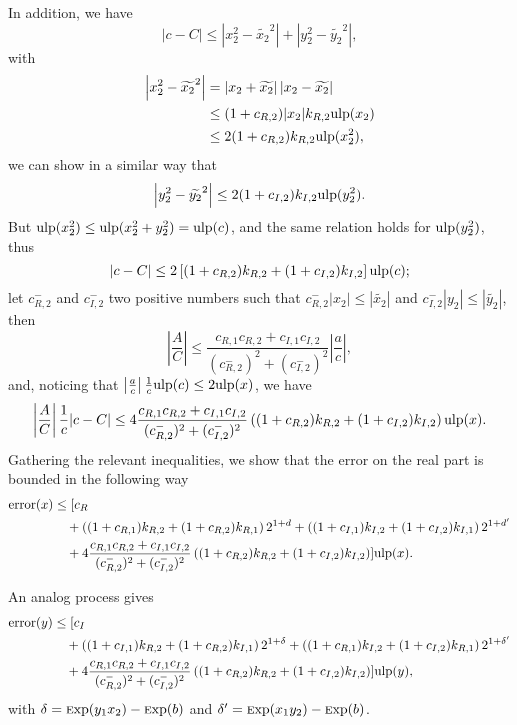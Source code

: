 \documentclass {article}
\newcommand {\Ulp}{{\rm ulp}}
\DeclareMathOperator{\error}{error}
\DeclareMathOperator{\Exp}{{\rm \textsc exp}}
\begin{document}
In addition, we have
\[
|c-C| \leq \left|x_2^2-\widetilde{x_2}^2\right| +
\left|y_2^2-\widetilde{y_2}^2\right|,
\]
with
\begin{align*}
\left|x_2^2-\widetilde{x_2}^2\right| &= \left|x_2+\widetilde{x_2}\right|
\left|x_2-\widetilde{x_2}\right|\\ &\leq (1+c_{R,2})|x_2|k_{R,2}
\Ulp(x_2)\\ &\leq 2(1+c_{R,2})k_{R,2}\Ulp(x_2^2),
\end{align*}
we can show in a similar way that
\[
\left|y_2^2-\widetilde{y_2}^2\right| \leq 2(1+c_{I,2})k_{I,2}\Ulp(y_2^2).
\]
But $\Ulp(x_2^2) \leq \Ulp(x_2^2+y_2^2) = \Ulp(c)$, and the same relation
holds for $\Ulp(y_2^2)$, thus
\[
|c-C| \leq 2\left[(1+c_{R,2})k_{R,2}+(1+c_{I,2})k_{I,2}\right]\Ulp(c);
\]
let $c_{R,2}^-$ and $c_{I,2}^-$ two positive numbers such that $c_{R,2}^-|x_2|
\leq \left|\widetilde{x_2}\right|$ and $c_{I,2}^-|y_2| \leq
\left|\widetilde{y_2}\right|$, then
\[
\left|\frac{A}{C}\right| \leq
\frac{c_{R,1}c_{R,2}+c_{I,1}c_{I,2}}{(c_{R,2}^-)^2+(c_{I,2}^-)^2}
\left|\frac{a}{c}\right|,
\]
and, noticing that $\left|\frac{a}{c}\right|\frac{1}{c}\Ulp(c) \leq 2\Ulp(x)$,
we have
\[
\left|\frac{A}{C}\right|\frac{1}{c}|c-C| \leq
4\frac{c_{R,1}c_{R,2}+c_{I,1}c_{I,2}}{(c_{R,2}^-)^2+(c_{I,2}^-)^2}
\left((1+c_{R,2})k_{R,2}+(1+c_{I,2})k_{I,2}\right)\Ulp(x).
\]
Gathering the relevant inequalities, we show that the error on the real part
is bounded in the following way
\begin{equation*}
  \begin{split}
    \error(x) &\leq [c_R\\
    &\quad+\left((1+c_{R,1})k_{R,2}+(1+c_{R,2})k_{R,1}\right)2^{1+d}
    +\left((1+c_{I,1})k_{I,2}+(1+c_{I,2})k_{I,1}\right)2^{1+d'}\\
    &\quad+4\frac{c_{R,1}c_{R,2}+c_{I,1}c_{I,2}}{(c_{R,2}^-)^2+(c_{I,2}^-)^2}
    \left((1+c_{R,2})k_{R,2}+(1+c_{I,2})k_{I,2}\right)]
    \Ulp(x).
  \end{split}
\end{equation*}

An analog process gives
\begin{equation*}
  \begin{split}
    \error(y) &\leq [c_I\\
    &\quad+\left((1+c_{I,1})k_{R,2}+(1+c_{R,2})k_{I,1}\right)2^{1+\delta}
    +\left((1+c_{R,1})k_{I,2}+(1+c_{I,2})k_{R,1}\right)2^{1+\delta'}\\
    &\quad+4\frac{c_{R,1}c_{R,2}+c_{I,1}c_{I,2}}{(c_{R,2}^-)^2+(c_{I,2}^-)^2}
    \left((1+c_{R,2})k_{R,2}+(1+c_{I,2})k_{I,2}\right)]
    \Ulp(y),
  \end{split}
\end{equation*}
with $\delta=\Exp(y_1x_2)-\Exp(b)$ and $\delta'=\Exp(x_1y_2)-\Exp(b)$.
\end{document}
